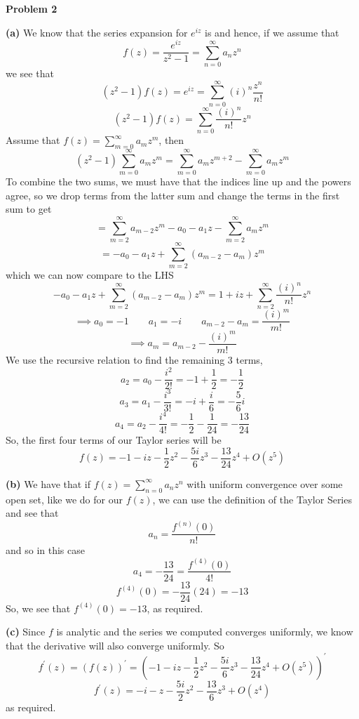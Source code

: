 \documentclass[10pt]{article}
\begin{document}
\textbf{Problem 2}

\textbf{(a)}
We know that the series expansion for $e^{iz}$ is and hence, if we assume that
$$f(z) = \frac{e^{iz}}{z^{2} - 1} = \sum_{n=0}^{\infty}a_{n}z^{n}$$
we see that
$$(z^{2} - 1)f(z) = e^{iz} = \sum_{n=0}^{\infty}(i)^{n}\frac{z^{n}}{n!}$$
$$(z^{2} - 1)f(z) = \sum_{n=0}^{\infty}\frac{(i)^{n}}{n!}z^{n}$$
Assume that $f(z) = \sum_{m=0}^{\infty}a_{m}z^{m}$, then
$$(z^{2} - 1)\sum_{m=0}^{\infty}a_{m}z^{m} = \sum_{m=0}^{\infty}a_{m}z^{m+2} - \sum_{m=0}^{\infty}a_{m}z^{m}$$
To combine the two sums, we must have that the indices line up and the powers agree, so we drop terms from the latter sum and change the terms in the first sum to get
$$= \sum_{m=2}^{\infty}a_{m-2}z^{m} - a_{0} - a_{1}z - \sum_{m=2}^{\infty}a_{m}z^{m}$$
$$= -a_{0}-a_{1}z + \sum_{m=2}^{\infty}(a_{m-2} - a_{m})z^{m}$$
which we can now compare to the LHS
$$ -a_{0}-a_{1}z + \sum_{m=2}^{\infty}(a_{m-2} - a_{m})z^{m} = 1 + iz + \sum_{n=2}^{\infty}\frac{(i)^{n}}{n!}z^{n}$$
$$\implies a_{0} = -1 \hspace{2em} a_{1} = -i \hspace{2em} a_{m-2} - a_{m} = \frac{(i)^{m}}{m!}$$
$$\implies a_{m} = a_{m-2} -  \frac{(i)^{m}}{m!}$$
We use the recursive relation to find the remaining 3 terms,
$$a_{2} = a_{0} - \frac{i^{2}}{2!} = -1 + \frac{1}{2} = -\frac{1}{2}$$
$$a_{3} = a_{1} - \frac{i^{3}}{3!} = -i + \frac{i}{6} = -\frac{5}{6}i$$
$$a_{4} = a_{2} - \frac{i^{4}}{4!} = -\frac{1}{2} - \frac{1}{24} = -\frac{13}{24}$$
So, the first four terms of our Taylor series will be
$$f(z) = -1 - iz - \frac{1}{2}z^{2} - \frac{5i}{6}z^{3} - \frac{13}{24}z^{4} + O(z^{5})$$

\textbf{(b)}
We have that if $f(z) = \sum_{n=0}^{\infty}a_{n}z^{n}$ with uniform convergence over some open set, like we do for our $f(z)$, we can use the definition of the Taylor Series and see that
$$a_{n} = \frac{f^{(n)}(0)}{n!}$$
and so in this case
$$a_{4} = -\frac{13}{24} = \frac{f^{(4)}(0)}{4!}$$
$$f^{(4)}(0) = -\frac{13}{24}(24) = -13$$
So, we see that $f^{(4)}(0) = -13$, as required.

\textbf{(c)}
Since $f$ is analytic and the series we computed converges uniformly, we know that the derivative will also converge uniformly. So
$$f^{\prime}(z) = (f(z))^{\prime} = \left(-1 - iz - \frac{1}{2}z^{2} - \frac{5i}{6}z^{3} - \frac{13}{24}z^{4} + O(z^{5})\right)^{\prime}$$
$$f^{\prime}(z)= -i -z -\frac{5i}{2}z^{2} - \frac{13}{6}z^{3} + O(z^{4})$$
as required.
\end{document}
